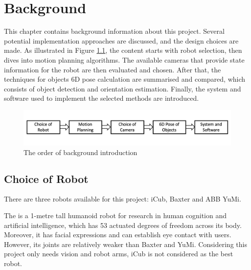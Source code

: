 \chapter{Background}

This chapter contains background information about this project. Several potential implementation approaches are discussed, and the design choices are made. As illustrated in Figure \ref{bgov}, the content starts with robot selection, then dives into motion planning algorithms. The available cameras that provide state information for the robot are then evaluated and chosen. After that, the techniques for objects 6D pose calculation are summarised and compared, which consists of object detection and orientation estimation. Finally, the system and software used to implement the selected methods are introduced.

\begin{figure}[H]
\centering
\includegraphics[width = \columnwidth]{background/backgroundov.png}
\caption{The order of background introduction}
\label{bgov}
\end{figure}

\section{Choice of Robot}
There are three robots available for this project: iCub, Baxter and ABB YuMi.

The \citep{iCub} is a 1-metre tall humanoid robot for research in human cognition and artificial intelligence, which has 53 actuated degrees of freedom across its body. Moreover, it has facial expressions and can establish eye contact with users. However, its joints are relatively weaker than Baxter and YuMi. Considering this project only needs vision and robot arms, iCub is not considered as the best robot.

